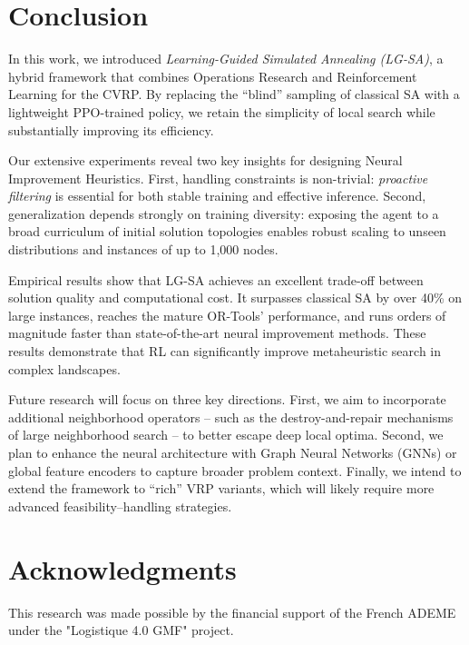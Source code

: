\documentclass[letterpaper]{article} %
\begin{document}
\section{Conclusion}


In this work, we introduced \textit{Learning-Guided Simulated Annealing (LG-SA)}, a hybrid framework that combines Operations Research and Reinforcement Learning for the CVRP. By replacing the ``blind'' sampling of classical SA with a lightweight PPO-trained policy, we retain the simplicity of local search while substantially improving its efficiency.


Our extensive experiments reveal two key insights for designing Neural Improvement Heuristics. First, handling constraints is non-trivial: \textit{proactive filtering} is essential for both stable training and effective inference. Second, generalization depends strongly on training diversity: exposing the agent to a broad curriculum of initial solution topologies enables robust scaling to unseen distributions and instances of up to 1{,}000 nodes.


Empirical results show that LG-SA achieves an excellent trade-off between solution quality and computational cost. It surpasses classical SA by over 40\% on large instances, reaches the mature OR-Tools' performance, and runs orders of magnitude faster than state-of-the-art neural improvement methods. These results demonstrate that RL can significantly improve metaheuristic search in complex landscapes.



Future research will focus on three key directions. First, we aim to incorporate additional neighborhood operators -- such as the destroy-and-repair mechanisms of large neighborhood search -- to better escape deep local optima. Second, we plan to enhance the neural architecture with Graph Neural Networks (GNNs) or global feature encoders to capture broader problem context. Finally, we intend to extend the framework to ``rich'' VRP variants, which will likely require more advanced feasibility–handling strategies.

\section{Acknowledgments}

This research was made possible by the financial support of the French ADEME under the "Logistique 4.0 GMF" project.


\end{document}
